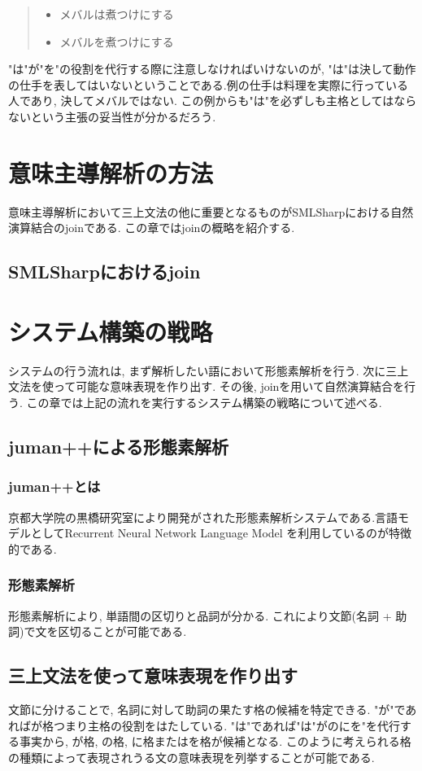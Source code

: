 \documentclass{jreport}
\begin{document}
\begin{quote}
 \begin{itemize}
  \item メバルは煮つけにする
  \item メバルを煮つけにする
 \end{itemize}
\end{quote}

"は"が"を"の役割を代行する際に注意しなければいけないのが, 
"は"は決して動作の仕手を表してはいないということである.例の仕手は料理を実際に行っている人であり, 
決してメバルではない. この例からも"は"を必ずしも主格としてはならないという主張の妥当性が分かるだろう.

\chapter{意味主導解析の方法}
意味主導解析において三上文法の他に重要となるものがSMLSharpにおける自然演算結合のjoinである.
この章ではjoinの概略を紹介する.

\section{SMLSharpにおけるjoin}

\chapter{システム構築の戦略}
システムの行う流れは, まず解析したい語において形態素解析を行う. 次に三上文法を使って可能な意味表現を作り出す. 
その後, joinを用いて自然演算結合を行う.
この章では上記の流れを実行するシステム構築の戦略について述べる.
 
\section{juman++による形態素解析}
\subsection{juman++とは}
京都大学院の黒橋研究室により開発がされた形態素解析システムである.言語モデルとしてRecurrent Neural Network Language Model
を利用しているのが特徴的である.
\subsection{形態素解析}
形態素解析により, 単語間の区切りと品詞が分かる. これにより文節(名詞 + 助詞)で文を区切ることが可能である.

\section{三上文法を使って意味表現を作り出す}
文節に分けることで, 名詞に対して助詞の果たす格の候補を特定できる.
"が"であればが格つまり主格の役割をはたしている.
"は"であれば"は"がのにを"を代行する事実から, が格, の格, に格またはを格が候補となる.
このように考えられる格の種類によって表現されうる文の意味表現を列挙することが可能である.
\end{document}
